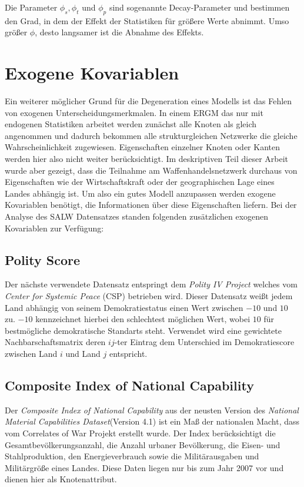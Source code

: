 \documentclass[a4paper,ngerman,oneside,titlepage,bibliography=totoc,11pt]{scrreprt}
\begin{document}
Die Parameter $\phi_s, \phi_t$ und $\phi_p$ sind sogenannte Decay-Parameter und bestimmen den Grad, in dem der Effekt der Statistiken für größere Werte abnimmt. Umso größer $\phi$, desto langsamer ist die Abnahme des Effekts.
\section{Exogene Kovariablen}
\label{sec:exkov}
Ein weiterer möglicher Grund für die Degeneration eines Modells ist das Fehlen von exogenen Unterscheidungsmerkmalen. In einem ERGM das nur mit endogenen Statistiken arbeitet werden zunächst alle Knoten als gleich angenommen und dadurch bekommen alle strukturgleichen Netzwerke die gleiche Wahrscheinlichkeit zugewiesen. Eigenschaften einzelner Knoten oder Kanten werden hier also nicht weiter berücksichtigt. Im deskriptiven Teil dieser Arbeit wurde aber gezeigt, dass die Teilnahme am Waffenhandelsnetzwerk durchaus von Eigenschaften  wie der Wirtschaftskraft oder der geographischen Lage eines Landes abhängig ist. Um also ein gutes Modell anzupassen werden exogene Kovariablen benötigt, die Informationen über diese Eigenschaften liefern.
Bei der Analyse des SALW Datensatzes standen folgenden zusätzlichen exogenen Kovariablen zur Verfügung:

\subsection{Polity Score}
Der nächste verwendete Datensatz entspringt dem \emph{Polity IV Project} welches vom \emph{Center for Systemic Peace} (CSP) \citep{polity} betrieben wird. Dieser Datensatz weißt jedem Land abhängig von seinem Demokratiestatus einen Wert zwischen $-10$ und $10$ zu. $-10$ kennzeichnet hierbei den schlechtest möglichen Wert, wobei $10$ für bestmögliche demokratische Standarts steht. Verwendet wird eine gewichtete Nachbarschaftsmatrix deren $ij$-ter Eintrag dem Unterschied im Demokratiescore zwischen Land $i$ und Land $j$ entspricht.

\subsection{Composite Index of National Capability}
Der \emph{Composite Index of National Capability} aus der neusten Version des \emph{National Material Capabilities Dataset}(Version 4.1)  \citep{CINC} ist ein Maß der nationalen Macht, dass vom Correlates of War Projekt erstellt wurde. Der Index berücksichtigt die Gesamtbevölkerungsanzahl, die Anzahl urbaner Bevölkerung, die Eisen- und Stahlproduktion, den Energieverbrauch  sowie die Militärausgaben und Militärgröße eines Landes. Diese Daten liegen nur bis zum Jahr 2007 vor und dienen hier als Knotenattribut.
\end{document}

